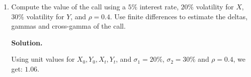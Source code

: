 \documentclass[12pt]{article}
\newenvironment{solution}{\vspace{0.2cm} \textbf{Solution.}}{}
\begin{document}
\begin{enumerate}[label=(\alph*)]
\begin{solution}
			
			In our case, we assume no dividend ($\mu_1 = \mu_2 = 0$) and $\alpha =\frac{1}{2}$, so the dynamics of $V_t$ simplifies to:
			\begin{dmath*}
			dV_t = \left(r - \frac{1}{4} \left(\sigma_1^2 + \sigma_2^2\right)\right) V_t dt + \frac{1}{2} V_t \left( \sigma_1 dW_t + \sigma_2 \left(\rho dW_t + \sqrt{1 - \rho^2}dZ_t \right)\right)
			\end{dmath*}
			
			If we call $dB_t = \frac{\sigma_1 dW_t + \sigma_2 \left(\rho dW_t + \sqrt{1 - \rho^2}dZ_t \right)}{\sigma_{X,Y}}$, where again $\sigma_{X,Y} = \sqrt{\sigma_1^2 + \sigma_2^2 + 2\rho \sigma_1 \sigma_2}$, $B_t$ is a Brownian and we have:
			\begin{dmath*}
			dV_t = \left(r - \frac{1}{4} \left(\sigma_1^2 + \sigma_2^2\right)\right) V_t dt + \frac{1}{2} \sigma_{X,Y} V_t dB_t
			\end{dmath*}

			Under this form, we see that $V_t = \sqrt{X_t Y_t}$ follows a lognormal distribution.
			
			Therefore, the price of the option is given by the following Black-Scholes formula:
			$$ f_t = \frac{1}{\sqrt{X_0 Y_0}} \left(e^{-\frac{1}{4} \left(\sigma_1^2 + \sigma_2^2\right)(T-t)}\sqrt{X_t Y_t} N(d_1^*) + \sqrt{X_0 Y_0} e^{-r(T-t)}N(d_2^*)\right)$$
			where
			\begin{dmath*}
			d_1^*(K) = \frac{2}{\sqrt{\sigma_1^2 + \sigma_2^2 + 2\rho \sigma_1 \sigma_2}\sqrt{T - t}}\left[\ln\left(\frac{\sqrt{X_t Y_t}}{\sqrt{X_0 Y_0}}\right) + \left(r - \frac{1}{4} \left(\sigma_1^2 + \sigma_2^2\right) + \frac{\sigma_1^2 + \sigma_2^2 + 2\rho \sigma_1 \sigma_2}{8}\right)(T - t)\right]
			\end{dmath*}
			\begin{dmath*}
			d_2^*(K) = d_1^* - \frac{1}{2} \sqrt{\sigma_1^2 + \sigma_2^2 + 2\rho \sigma_1 \sigma_2} \sqrt{T - t}
			\end{dmath*}
			
		\end{solution}
		
		\item Compute the value of the call using a $5\%$ interest rate, $20\%$ volatility for $X$, $30\%$ volatility for $Y$, and $\rho = 0.4$. Use finite differences to estimate the deltas, gammas and cross-gamma of the call.
		
		\begin{solution}
			
			Using unit values for $X_0,Y_0,X_t,Y_t$, and $\sigma_1 = 20\%$, $\sigma_2 = 30 \%$ and $\rho = 0.4$, we get: $1.06$.
			

\end{solution}
\end{enumerate}
\end{document}
